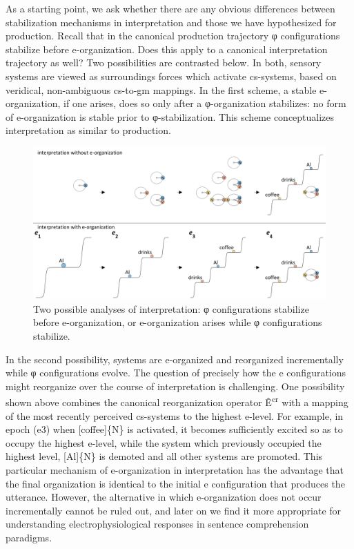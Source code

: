   As a starting point, we ask whether there are any obvious differences between stabilization mechanisms in interpretation and those we have hypothesized for production. Recall that in the canonical production trajectory φ configurations stabilize before e-organization. Does this apply to a canonical interpretation trajectory as well? Two possibilities are contrasted below. In both, sensory systems are viewed as surroundings forces which activate cs-systems, based on veridical, non-ambiguous cs-to-gm mappings. In the first scheme, a stable e-organization, if one arises, does so only after a φ-organization stabilizes: no form of e-organization is stable prior to φ-stabilization. This scheme conceptualizes interpretation as similar to production.

  
\begin{figure}
\includegraphics[width=\textwidth]{figures/Tilsen-img90.png}
\caption{Two possible analyses of interpretation: φ configurations stabilize before e-organization, or e-organization arises while φ configurations stabilize.}
\label{fig:4:40}
\end{figure}
 

  In the second possibility, systems are e-organized and reorganized incrementally while φ configurations evolve. The question of precisely how the e configurations might reorganize over the course of interpretation is challenging. One possibility shown above combines the canonical reorganization operator Ê\textsuperscript{cr} with a mapping of the most recently perceived cs-systems to the highest e-level. For example, in epoch (e3) when [coffee]\{N\} is activated, it becomes sufficiently excited so as to occupy the highest e-level, while the system which previously occupied the highest level, [Al]\{N\} is demoted and all other systems are promoted. This particular mechanism of e-organization in interpretation has the advantage that the final organization is identical to the initial e configuration that produces the utterance. However, the alternative in which e-organization does not occur incrementally cannot be ruled out, and later on we find it more appropriate for understanding electrophysiological responses in sentence comprehension paradigms.

